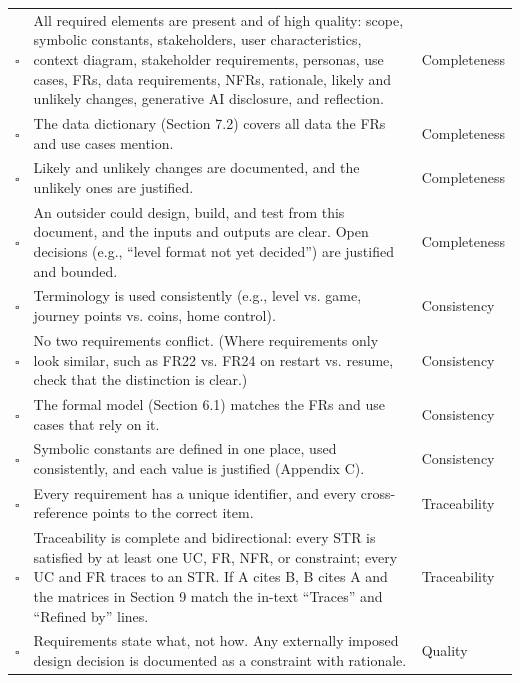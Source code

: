 \documentclass[10pt,titlepage]{article}
\newcommand{\chk}{$\square$}
\begin{document}
\begin{longtable}{@{}>{\raggedright\arraybackslash}p{} >{\raggedright\arraybackslash}p{} >{\raggedright\arraybackslash}p{}@{}}
\chk & All required elements are present and of high quality: scope, symbolic constants, stakeholders,
user characteristics, context diagram, stakeholder requirements, personas, use cases, 
FRs, data requirements, NFRs, rationale,
likely and unlikely changes, generative AI disclosure, and reflection.
& Completeness \\

\chk & The data dictionary (Section 7.2) covers all data the FRs and use cases mention.
& Completeness \\

\chk & Likely and unlikely changes are documented, and the unlikely ones are justified.
& Completeness \\

\chk & An outsider could design, build, and test from this document, and the inputs and outputs 
are clear. Open decisions (e.g., “level format not yet decided”) are justified and bounded.
& Completeness \\

\chk & Terminology is used consistently (e.g., level vs. game, journey points vs. coins, home control).
& Consistency \\

\chk & No two requirements conflict. (Where requirements only look similar, such as FR22 vs. FR24 
on restart vs. resume, check that the distinction is clear.)
& Consistency \\

\chk & The formal model (Section 6.1) matches the FRs and use cases that rely on it.
& Consistency \\

\chk & Symbolic constants are defined in one place, used consistently, and each value is 
justified (Appendix C).
& Consistency \\

\chk & Every requirement has a unique identifier, and every cross-reference points to the correct item.
& Traceability \\

\chk & Traceability is complete and bidirectional: every STR is satisfied by at least one UC, FR, NFR, 
or constraint; every UC and FR traces to an STR. If A cites B, B cites A and the matrices in 
Section 9 match the in-text “Traces” and “Refined by” lines.
& Traceability \\

\chk & Requirements state what, not how. Any externally imposed design decision is documented as a 
constraint with rationale.
& Quality \\


\end{longtable}
\end{document}
